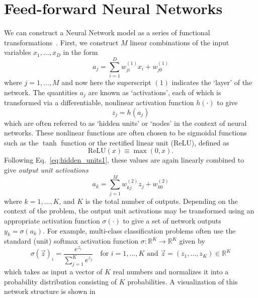\documentclass[../main.tex]{subfiles}
\begin{document}
\section{Feed-forward Neural Networks}
We can construct a Neural Network model as a series of functional
transformations~\cite{Bishop}.
%
First, we construct $M$ linear combinations of the input variables $x_{1},
\ldots, x_{D}$ in the form
%
\begin{equation}
  a_{j} = \sum_{i=1}^{D} w_{ji}^{(1)} x_{i} + w_{j0}^{(1)}
  \label{eq:activations1}
\end{equation}
%
where $j = 1, \ldots, M$ and now here the superscript $(1)$ indicates the
`layer' of the network.
%
The quantities $a_j$ are known as `activations', each of which is transformed
via a differentiable, nonlinear activation function $h(\cdot)$ to give
%
\begin{equation}
  z_{j} = h(a_{j})
  \label{eq:hidden_units1}
\end{equation}
%
which are often referred to as `hidden units' or `nodes' in the context of
neural networks.
%
These nonlinear functions are often chosen to be sigmoidal functions such as
the $\tanh$ function or the rectified linear unit (ReLU), defined as
%
\begin{equation}
  \mathrm{ReLU}(x) \equiv \max{(0, x)}.
\end{equation}
%
Following Eq.~\ref{eq:hidden_units1}, these values are again linearly combined
to give \emph{output unit activations}
%
\begin{equation}
  a_{k} = \sum_{j=1}^{M} w_{kj}^{(2)} z_{j} + w_{k0}^{(2)}
\end{equation}
%
where $k = 1, \ldots, K$, and $K$ is the total number of outputs. Depending on
the context of the problem, the output unit activations may be transformed
using an appropriate activation function $\sigma(\cdot)$ to give a set of
network outputs $y_{k} = \sigma(a_{k})$.
%
For example, multi-class classification problems often use the standard (unit)
softmax activation function $\sigma: \mathbb{R}^{K} \rightarrow \mathbb{R}^{K}$
given by
%
\begin{equation}
  \sigma{(\vec{z})}_{i} = \frac{e^{z_{i}}}{\sum_{j=1}^{K} e^{z_{j}}}\quad \mathrm{for}\,\, i = 1, \ldots, K\,\,
  \mathrm{and} \,\, \vec{z} = {(z_1, \ldots, z_{K})} \in \mathbb{R}^{K}
\end{equation}
%
which takes as input a vector of $K$ real numbers and normalizes it into a
probability distribution consisting of $K$ probabilities.
%
A visualization of this network structure is shown in
\end{document}
